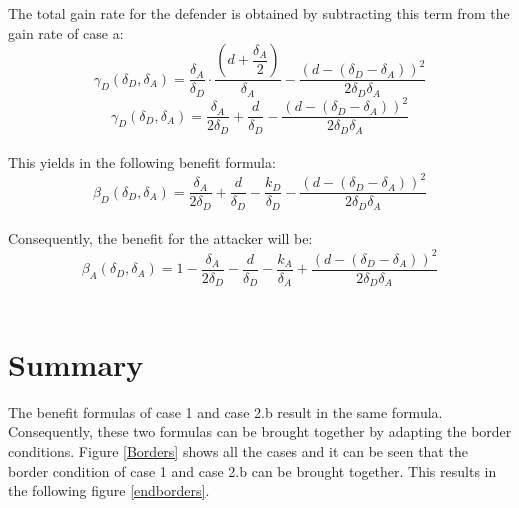 The total gain rate for the defender is obtained by subtracting this term from the gain rate of case a:
 \begin{equation*}
\gamma_{D}(\delta_{D},\delta_{A}) = \dfrac{\delta_{A}}{\delta_{D}} \cdot \dfrac{(d+\dfrac{\delta_{A}}{2})}{\delta_{A}} - \dfrac{(d - (\delta_{D} - \delta_{A}))^{2}}{2 \delta_{D} \delta_{A}}
\end{equation*}
\begin{equation*}
\gamma_{D}(\delta_{D},\delta_{A}) = \dfrac{\delta_{A}}{2\delta_{D}} + \dfrac{d}{\delta_{D}} - \dfrac{(d - (\delta_{D} - \delta_{A}))^{2}}{2 \delta_{D} \delta_{A}}
\end{equation*}\\
This yields in the following benefit formula:
\begin{equation}\label{benfcase2b:defender}
\beta_{D}(\delta_{D},\delta_{A}) = \dfrac{\delta_{A}}{2\delta_{D}} + \dfrac{d}{\delta_{D}} - \dfrac{k_{D}}{ \delta_{D}} - \dfrac{(d - (\delta_{D} - \delta_{A}))^{2}}{2 \delta_{D} \delta_{A}}
\end{equation}\\
 
Consequently, the benefit for the attacker will be:
\begin{equation}\label{benfcase2b:attacker}
\beta_{A}(\delta_{D},\delta_{A}) = 1 -\dfrac{\delta_{A}}{2\delta_{D}} - \dfrac{d}{\delta_{D}} - \dfrac{k_{A}}{ \delta_{A}} + \dfrac{(d - (\delta_{D} - \delta_{A}))^{2}}{2 \delta_{D} \delta_{A}}
\end{equation}\\

\section{Summary}

The benefit formulas of case 1 and case 2.b result in the same formula. Consequently, these two formulas can be brought together by adapting the border conditions. Figure \ref{Borders} shows all the cases and it can be seen that the border condition of case 1 and case 2.b can be brought together. This results in the following figure \ref{endborders}. \\

